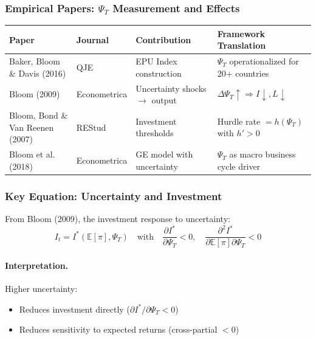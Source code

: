\subsubsection{Empirical Papers: $\Psi_T$ Measurement and Effects}

\begin{center}
\small
\renewcommand{\arraystretch}{1.3}
\begin{tabular}{|p{3.5cm}|p{2cm}|p{4cm}|p{4cm}|}
\hline
\textbf{Paper} & \textbf{Journal} & \textbf{Contribution} & \textbf{Framework Translation} \\
\hline
Baker, Bloom \& Davis (2016) & QJE & EPU Index construction & $\Psi_T$ operationalized for 20+ countries \\
\hline
Bloom (2009) & Econometrica & Uncertainty shocks $\to$ output & $\Delta\Psi_T \uparrow \Rightarrow I\downarrow, L\downarrow$ \\
\hline
Bloom, Bond \& Van Reenen (2007) & REStud & Investment thresholds & Hurdle rate $= h(\Psi_T)$ with $h' > 0$ \\
\hline
Bloom et al. (2018) & Econometrica & GE model with uncertainty & $\Psi_T$ as macro business cycle driver \\
\hline
\end{tabular}
\end{center}

\subsubsection{Key Equation: Uncertainty and Investment}

From Bloom (2009), the investment response to uncertainty:
\begin{equation}
I_t = I^*(\mathbb{E}[\pi], \Psi_T) \quad \text{with} \quad 
\frac{\partial I^*}{\partial \Psi_T} < 0, \quad
\frac{\partial^2 I^*}{\partial \mathbb{E}[\pi] \partial \Psi_T} < 0
\label{eq:bloom-investment}
\end{equation}

\paragraph{Interpretation.}
Higher uncertainty:
\begin{itemize}
    \item Reduces investment directly ($\partial I^*/\partial \Psi_T < 0$)
    \item Reduces sensitivity to expected returns (cross-partial $< 0$)
\end{itemize}

